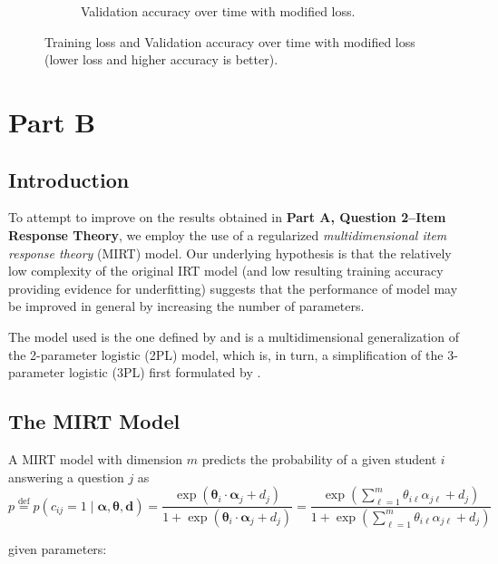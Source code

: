 \documentclass[10pt]{article}
\renewcommand{\bf}[1]{\mathbf{#1}}
\newcommand{\eqdef}[0]{\stackrel{\text{def}}{=}}
\begin{document}
\begin{enumerate}
\begin{enumerate}[label = \textbf{\alph*}.]
\begin{figure}[h!]
\begin{subfigure}[h!]{.46\textwidth}
                \caption{Validation accuracy over time with modified loss.}
            \end{subfigure}
            \caption{Training loss and Validation accuracy over time with modified loss (lower loss and higher accuracy is better).}
            \label{fig:pAq3e}
        \end{figure}
    \end{enumerate}
\end{enumerate}

\newpage
\section*{Part B}

\subsection*{Introduction}

To attempt to improve on the results obtained in \textbf{Part A, Question 2–Item Response Theory}, we employ the use of a regularized \textit{multidimensional item response theory} (MIRT) model. Our underlying hypothesis is that the relatively low complexity of the original IRT model (and low resulting training accuracy providing evidence for underfitting) suggests that the performance of model may be improved in general by increasing the number of parameters.

\spacer

The model used is the one defined by \cite{mirt} and is a multidimensional generalization of the 2-parameter logistic (2PL) model, which is, in turn, a simplification of the 3-parameter logistic (3PL) first formulated by \cite{3pl}.

\subsection*{The MIRT Model}

A MIRT model with dimension $m$ predicts the probability of a given student $i$ answering a question $j$ as
$$
    p
    \eqdef p(c_{ij} = 1\mid \bm\alpha,\bm\theta,\bf d)
    = \frac{\exp(\bm\theta_{i}\cdot \bm\alpha_{j} + d_j)}{1+\exp(\bm\theta_{i}\cdot \bm\alpha_{j} + d_j)}
    = \frac{\displaystyle \exp\left(\sum_{\ell = 1}^m \theta_{i\ell}\alpha_{j\ell} + d_j\right)}{\displaystyle 
 1+\exp\left(\sum_{\ell = 1}^m \theta_{i\ell}\alpha_{j\ell} + d_j\right)}
$$

given parameters:
\end{document}
